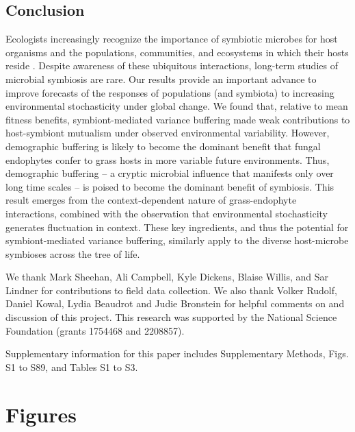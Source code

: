 \documentclass[lineno, sn-basic]{sn-jnl}%
\begin{document}
\subsection*{Conclusion}
Ecologists increasingly recognize the importance of symbiotic microbes for host organisms and the populations, communities, and ecosystems in which their hosts reside \citep{afkhami2016native,smith2017symbiont,dallas2022captivity,wu2022reduction}.
Despite awareness of these ubiquitous interactions, long-term studies of microbial symbiosis are rare. 
Our results provide an important advance to improve forecasts of the responses of populations (and symbiota) to increasing environmental stochasticity under global change. 
We found that, relative to mean fitness benefits, symbiont-mediated variance buffering made weak contributions to host-symbiont mutualism under observed environmental variability.
However, demographic buffering is likely to become the dominant benefit that fungal endophytes confer to grass hosts in more variable future environments.
Thus, demographic buffering -- a cryptic microbial influence that manifests only over long time scales -- is poised to become the dominant benefit of symbiosis.
This result emerges from the context-dependent nature of grass-endophyte interactions, combined with the observation that environmental stochasticity generates fluctuation in context. 
These key ingredients, and thus the potential for symbiont-mediated variance buffering, similarly apply to the diverse host-microbe symbioses across the tree of life. 
\newpage




\backmatter


We thank Mark Sheehan, Ali Campbell, Kyle Dickens, Blaise Willis, and Sar Lindner for contributions to field data collection. 
We also thank Volker Rudolf, Daniel Kowal, Lydia Beaudrot and Judie Bronstein for helpful comments on and discussion of this project. 
This research was supported by the National Science Foundation (grants 1754468 and 2208857). 


 Supplementary information for this paper includes Supplementary Methods, Figs. S1 to S89, and Tables S1 to S3. 









\clearpage


\section*{Figures}
\end{document}
